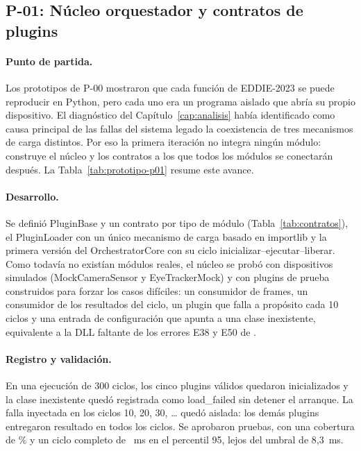 \subsection{P-01: Núcleo orquestador y contratos de plugins}
\label{sec:it_p01}

\paragraph{Punto de partida.} Los prototipos de P-00 mostraron que cada función de EDDIE-2023 se puede reproducir en Python, pero cada uno era un programa aislado que abría su propio dispositivo. El diagnóstico del Capítulo~\ref{cap:analisis} había identificado como causa principal de las fallas del sistema legado la coexistencia de tres mecanismos de carga distintos. Por eso la primera iteración no integra ningún módulo: construye el núcleo y los contratos a los que todos los módulos se conectarán después. La Tabla~\ref{tab:prototipo-p01} resume este avance.



\paragraph{Desarrollo.} Se definió PluginBase y un contrato por tipo de módulo (Tabla~\ref{tab:contratos}), el PluginLoader con un único mecanismo de carga basado en importlib y la primera versión del OrchestratorCore con su ciclo inicializar--ejecutar--liberar. Como todavía no existían módulos reales, el núcleo se probó con dispositivos simulados (MockCameraSensor y EyeTrackerMock) y con plugins de prueba construidos para forzar los casos difíciles: un consumidor de frames, un consumidor de los resultados del ciclo, un plugin que falla a propósito cada 10 ciclos y una entrada de configuración que apunta a una clase inexistente, equivalente a la DLL faltante de los errores E38 y E50 de \citet{ibaceta2023evaluacion}.

\paragraph{Registro y validación.} En una ejecución de 300 ciclos, los cinco plugins válidos quedaron inicializados y la clase inexistente quedó registrada como load\_failed sin detener el arranque. La falla inyectada en los ciclos 10, 20, 30, \ldots{} quedó aislada: los demás plugins entregaron resultado en todos los ciclos. Se aprobaron \PUnoPruebas{} pruebas, con una cobertura de \PUnoCobertura\% y un ciclo completo de \PUnoCicloPnoventaycinco~ms en el percentil 95, lejos del umbral de 8,3~ms.

